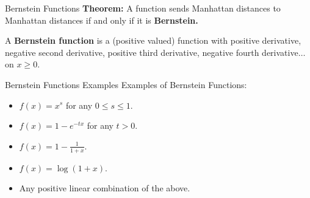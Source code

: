 \begin{frame}{Bernstein Functions}
\textbf{Theorem:} A function sends Manhattan distances to Manhattan
distances if and only if it is \textbf{Bernstein.}
\vs

\pause

  A \textbf{Bernstein function} is a (positive valued) function with
  positive derivative, negative second derivative, positive third derivative,
  negative fourth derivative$\ldots$ on $x \geq 0$.
\end{frame}

\begin{frame}{Bernstein Functions Examples}
Examples of Bernstein Functions:
\pause
  \begin{itemize}[<+->]
    \item $f(x) = x^s$ for any $0 \leq s \leq 1$.
    \item $f(x) = 1-e^{-tx}$ for any $ t > 0$.
    \item $f(x) = 1 - \frac{1}{1+x}$.
    \item $f(x) = \log(1+x)$.
    \item Any positive linear combination of the above.
  \end{itemize}
\end{frame}

